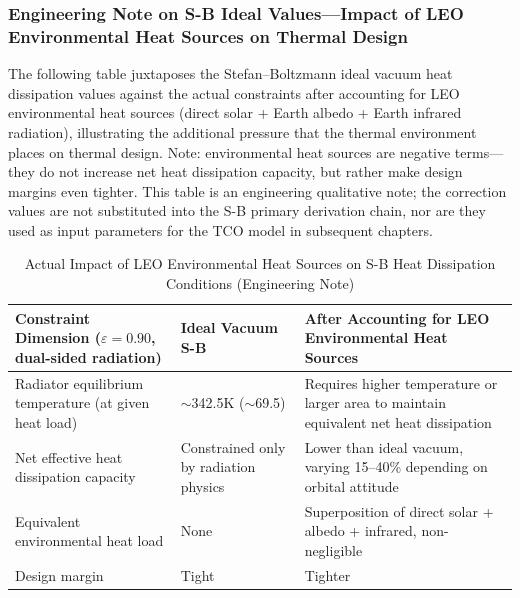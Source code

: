 \subsubsection{Engineering Note on S-B Ideal Values---Impact of LEO Environmental Heat Sources on Thermal Design}

The following table juxtaposes the Stefan--Boltzmann ideal vacuum heat dissipation values against the actual constraints after accounting for LEO environmental heat sources (direct solar + Earth albedo + Earth infrared radiation), illustrating the additional pressure that the thermal environment places on thermal design. Note: environmental heat sources are negative terms---they do not increase net heat dissipation capacity, but rather make design margins even tighter. This table is an engineering qualitative note; the correction values are not substituted into the S-B primary derivation chain, nor are they used as input parameters for the TCO model in subsequent chapters.

\begin{table}[H]
\centering
\caption{Actual Impact of LEO Environmental Heat Sources on S-B Heat Dissipation Conditions (Engineering Note)}
\label{tab:leo_sb_correction}
\small
\begin{tabularx}{0.96\textwidth}{
  >{\raggedright\arraybackslash}p{}
  >{\centering\arraybackslash}p{}
  >{\raggedright\arraybackslash}X
}
\toprule
\textbf{Constraint Dimension ($\varepsilon=0.90$, dual-sided radiation)} & \textbf{Ideal Vacuum S-B} & \textbf{After Accounting for LEO Environmental Heat Sources} \\
\midrule
Radiator equilibrium temperature (at given heat load)     & $\sim$342.5\;K ($\sim$69.5\unitC{}) & Requires higher temperature or larger area to maintain equivalent net heat dissipation \\
Net effective heat dissipation capacity                   & Constrained only by radiation physics & Lower than ideal vacuum, varying 15--40\% depending on orbital attitude \\
Equivalent environmental heat load                       & None                              & Superposition of direct solar + albedo + infrared, non-negligible \\
Design margin                                           & Tight                             & Tighter \\
\bottomrule
\end{tabularx}
\end{table}

